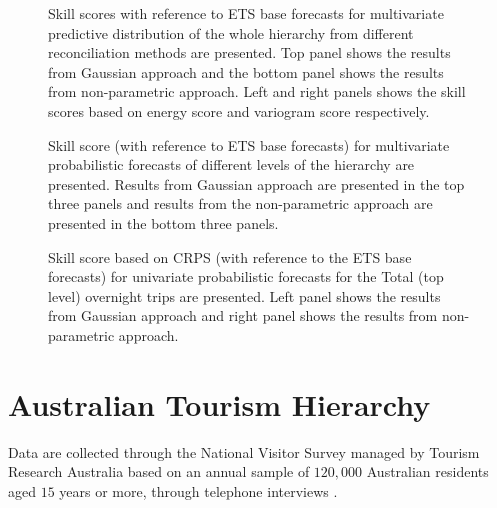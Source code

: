 \documentclass[12pt]{article}
\theoremstyle{definition}
\begin{document}
\begin{figure}[!hbt]
	\centering
	\small
	\caption{Skill scores with reference to ETS base forecasts for multivariate predictive distribution of the whole hierarchy from different reconciliation methods are presented. Top panel shows the results from Gaussian approach and the bottom panel shows the results from non-parametric approach. Left and right panels shows the skill scores based on energy score and variogram score respectively.}\label{fig:EmpResults_AllTS_ETS}
\end{figure}

\begin{figure}[!hbt]
	\centering
	\small
	\caption{Skill score (with reference to ETS base forecasts) for multivariate probabilistic forecasts of different levels of the hierarchy are presented. Results from Gaussian approach are presented in the top three panels and results from the non-parametric approach are presented in the bottom three panels.}\label{fig:EmpResults_Levels_ETS}
\end{figure}

\begin{figure}[!hbt]
	\centering
	\small
	\caption{Skill score based on CRPS (with reference to the ETS base forecasts) for univariate probabilistic forecasts for the Total (top level) overnight trips are presented. Left panel shows the results from Gaussian approach and right panel shows the results from non-parametric approach. }\label{fig:EmpResults_TopLevel_ETS}
\end{figure}

\FloatBarrier

\clearpage

\section{Australian Tourism Hierarchy}\label{app:AustralianData}

Data are collected through the National Visitor Survey managed by Tourism Research Australia based on an annual sample of $120,000$ Australian residents aged $15$ years or more, through telephone interviews \citep{TourismResearch2019}.
\end{document}
